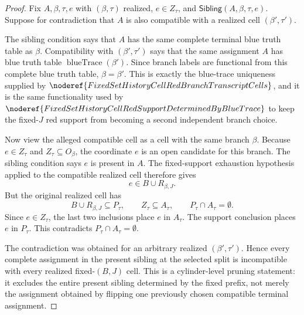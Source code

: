 \begin{proof}
Fix \(A,\beta,\tau,e\) with \((\beta,\tau)\) realized,
\(e\in Z_\tau\), and
\(\mathsf{Sibling}(A,\beta,\tau,e)\).  Suppose for contradiction that
\(A\) is also compatible with a realized cell \((\beta',\tau')\).

The sibling condition says that \(A\) has the same complete terminal blue
truth table as \(\beta\).  Compatibility with \((\beta',\tau')\) says that
the same assignment \(A\) has blue truth table
\(\operatorname{blueTrace}(\beta')\).  Since branch labels are functional
from this complete blue truth table, \(\beta=\beta'\).  This is exactly the
blue-trace uniqueness supplied by
\(\noderef{FixedSetHistoryCellRedBranchTranscriptCells}\), and it is the
same functionality used by
\(\noderef{FixedSetHistoryCellRedSupportDeterminedByBlueTrace}\) to keep the
fixed-\(J\) red support from becoming a second independent branch choice.

Now view the alleged compatible cell as a cell with the same branch
\(\beta\).  Because \(e\in Z_\tau\) and
\(Z_\tau\subseteq O_\beta\), the coordinate \(e\) is an open candidate for
this branch.  The sibling condition says \(e\) is present in \(A\).  The
fixed-support exhaustion hypothesis applied to the compatible realized cell
therefore gives
\[
e\in B\cup R_{\beta,J}.
\]
But the original realized cell has
\[
B\cup R_{\beta,J}\subseteq P_\tau,\qquad
Z_\tau\subseteq A_\tau,\qquad
P_\tau\cap A_\tau=\emptyset .
\]
Since \(e\in Z_\tau\), the last two inclusions place \(e\) in
\(A_\tau\).  The support conclusion places \(e\) in \(P_\tau\).  This
contradicts \(P_\tau\cap A_\tau=\emptyset\).

The contradiction was obtained for an arbitrary realized
\((\beta',\tau')\).  Hence every complete assignment in the present sibling
at the selected split is incompatible with every realized fixed-\((B,J)\)
cell.  This is a cylinder-level pruning statement: it excludes the entire
present sibling determined by the fixed prefix, not merely the assignment
obtained by flipping one previously chosen compatible terminal assignment.
\end{proof}
